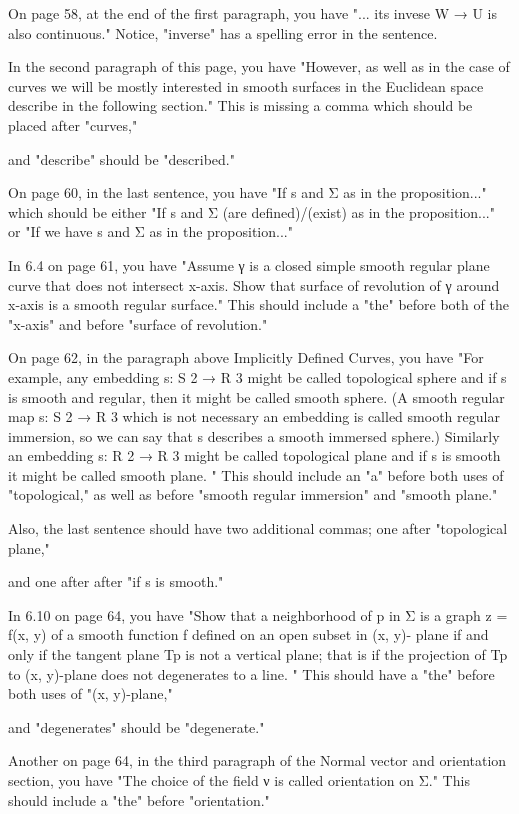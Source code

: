 
 On page 58, at the end of the first paragraph, you have "... its invese W → U is also continuous." Notice, "inverse" has a spelling error in the sentence. 
 
 In the second paragraph of this page, you have "However, as well as in the case of curves we will be mostly interested in smooth surfaces in the Euclidean space describe in the following section." This is missing a comma which should be placed after "curves," 
 
 and "describe" should be "described." 
 
 On page 60, in the last sentence, you have "If s and Σ as in the proposition..." which should be either "If s and Σ (are defined)/(exist) as in the proposition..." or "If we have s and Σ as in the proposition..." 
 
 In 6.4 on page 61, you have "Assume γ is a closed simple smooth regular plane curve that does not intersect x-axis. Show that surface of revolution of γ around x-axis is a smooth regular surface." This should include a "the" before both of the "x-axis" and before "surface of revolution." 
 
 On page 62, in the paragraph above Implicitly Defined Curves, you have "For example, any embedding s: S 2 → R 3 might be called topological sphere and if s is smooth and regular, then it might be called smooth sphere. (A smooth regular map s: S 2 → R 3 which is not necessary an embedding is called smooth regular immersion, so we can say that s describes a smooth immersed sphere.) Similarly an embedding s: R 2 → R 3 might be called topological plane and if s is smooth it might be called smooth plane. " This should include an "a" before both uses of "topological," as well as before "smooth regular immersion" and "smooth plane." 
 
 Also, the last sentence should have two additional commas; one after "topological plane," 
 
 and one after after "if s is smooth." 
 
 In 6.10 on page 64, you have "Show that a neighborhood of p in Σ is a graph z = f(x, y) of a smooth function f defined on an open subset in (x, y)- plane if and only if the tangent plane Tp is not a vertical plane; that is if the projection of Tp to (x, y)-plane does not degenerates to a line. " 
 This should have a "the" before both uses of "(x, y)-plane," 
 
 and "degenerates" should be "degenerate." 
 
 Another on page 64, in the third paragraph of the Normal vector and orientation section, you have "The choice of the field ν is called orientation on Σ." This should include a "the" before "orientation." 
 
